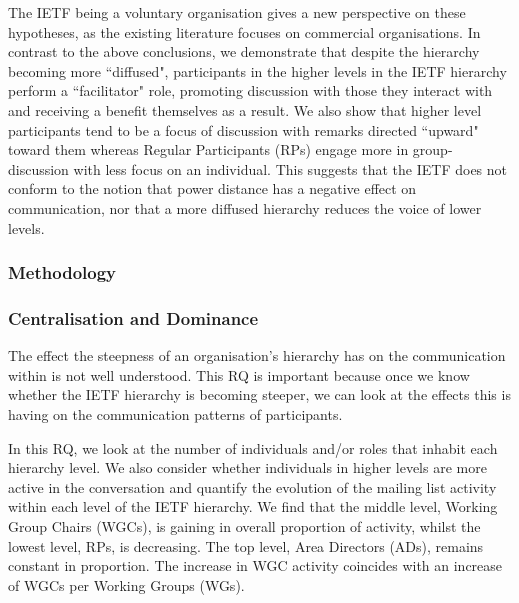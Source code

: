 \documentclass[twocolumn,10pt]{article}
\begin{document}
The IETF being a voluntary organisation gives a new perspective on these
hypotheses, as the existing literature focuses on commercial organisations.
In contrast to the above conclusions, we demonstrate that despite the
hierarchy becoming more ``diffused", participants in the higher levels in
the IETF hierarchy perform a ``facilitator" role, promoting discussion with
those they interact with and receiving a benefit themselves as a result. We
also show that higher level participants tend to be a focus of discussion
with remarks directed ``upward" toward them whereas Regular Participants
(RPs) engage more in group-discussion with less focus on an individual.
This suggests that the IETF does not conform to the notion that power
distance has a negative effect on communication, nor that a more diffused
hierarchy reduces the voice of lower levels.

\subsubsection{Methodology}
\label{sec:org-dyn:hierarchy:methodology}




\subsubsection{Centralisation and Dominance}
\label{sec:org-dyn:hierarchy:rq1}



The effect the steepness of an organisation's hierarchy has on the
communication within is not well understood. This RQ is important because
once we know whether the IETF hierarchy is becoming steeper, we can look at
the effects this is having on the communication patterns of participants.

In this RQ, we look at the number of individuals and/or roles that inhabit
each hierarchy level. We also consider whether individuals in higher levels
are more active in the conversation and quantify the evolution of the
mailing list activity within each level of the IETF hierarchy. We find that
the middle level, Working Group Chairs (WGCs), is gaining in overall
proportion of activity, whilst the lowest level, RPs, is decreasing. The
top level, Area Directors (ADs), remains constant in proportion. The
increase in WGC activity coincides with an increase of WGCs per Working
Groups (WGs).
\end{document}
